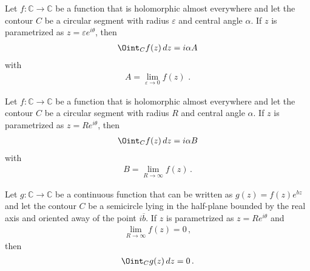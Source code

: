     \begin{theorem}\label{complex:small_limit}
        Let $f:\mathbb{C}\rightarrow\mathbb{C}$ be a function that is holomorphic almost everywhere and let the contour $C$ be a circular segment with radius $\varepsilon$ and central angle $\alpha$. If $z$ is parametrized as $z=\varepsilon e^{i\theta}$, then
        \begin{gather}
            \Oint_Cf(z)\,dz = i\alpha A
        \end{gather}
        with
        \begin{gather}
            A = \lim_{\varepsilon\rightarrow0}f(z)\,\,.
        \end{gather}
    \end{theorem}

    \begin{theorem}\label{complex:great_limit}
        Let $f:\mathbb{C}\rightarrow\mathbb{C}$ be a function that is holomorphic almost everywhere and let the contour $C$ be a circular segment with radius $R$ and central angle $\alpha$. If $z$ is parametrized as $z=Re^{i\theta}$, then
        \begin{gather}
            \Oint_Cf(z)\,dz = i\alpha B
        \end{gather}
        with
        \begin{gather}
            B = \lim_{R\rightarrow\infty}f(z)\,.
        \end{gather}
    \end{theorem}

    \begin{theorem}\label{complex:jordan}
        Let $g:\mathbb{C}\rightarrow\mathbb{C}$ be a continuous function that can be written as $g(z) = f(z)e^{bz}$ and let the contour $C$ be a semicircle lying in the half-plane bounded by the real axis and oriented away of the point $i\overline{b}$. If $z$ is parametrized as $z=Re^{i\theta}$ and
        \begin{gather}
            \lim_{R\rightarrow\infty}f(z) = 0\,,
        \end{gather}
        then
        \begin{gather}
            \Oint_Cg(z)\,dz = 0\,.
        \end{gather}
    \end{theorem}